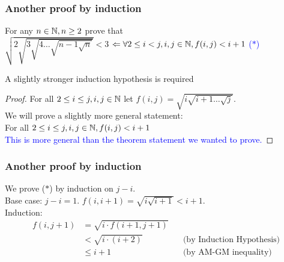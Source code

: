  \begin{frame}[fragile]
\frametitle{Another proof by induction}
\begin{theorem}
For any $n\in {{\mathbb{N}}}, n \geq 2$ prove that\\
$\sqrt{2\sqrt{3\sqrt{4\ldots \sqrt{n-1\sqrt{n}}}}} < 3$
\textcolor{blue}{$\Leftarrow \forall 2 \leq i < j, i,j \in {{\mathbb{N}}}, f(i,j) < i+1$ \hfill($\ast$)} 
\end{theorem}

A slightly stronger induction hypothesis is required


\begin{proof}
For all $2 \leq i \leq j, i,j \in {{\mathbb{N}}}$ let $f(i,j) = \sqrt{i\sqrt{i+1\ldots \sqrt{j}}}$. \\
We will prove a slightly more general statement:\\
For all $2 \leq i \leq j, i,j \in {{\mathbb{N}}}, f(i,j) < i+1$\\
\textcolor{blue}{This is more general than the theorem statement we wanted to prove.}

\end{proof}
\end{frame}



 \begin{frame}[fragile]
\frametitle{Another proof by induction}
We prove ($\ast$) by induction on $j-i$.\\

Base case: $j-i=1$. $f(i,i+1) = \sqrt{i\sqrt{i+1}}< i+1$.\\

Induction: 
\begin{align*}
f(i,j+1) &= \sqrt{i\cdot f(i+1,j+1)} 
&\\ 
&< \sqrt{i\cdot (i+2)} \qquad\qquad&\mbox{(by Induction Hypothesis)}\\ 
&\leq i+1 &\mbox{(by AM-GM inequality)} 
\end{align*}
\end{frame}

